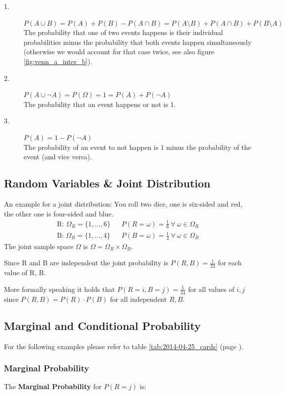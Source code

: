 \begin{description}
  \item[1.] $P(A \cup B) = P(A) + P(B) - P(A \cap B) = P(A \setminus B) + P(A \cap B) + P(B \setminus A)$
            \\ The probability that one of two events happens is their individual probabilities minus the probability that both events happen simultaneously (otherwise we would account for that case twice, see also figure \nolinebreak\ref{fig:venn_a_inter_b}).
  \item[2.] $P(A \cup \neg A) = P(\Omega) = 1 = P(A) + P(\neg A)$
            \\ The probability that an event happens or not is 1.
  \item[3.] $P(A) = 1 - P(\neg A)$
            \\ The probability of an event to not happen is 1 minus the probability of the event (and vice versa).
\end{description}

\subsection{Random Variables \& Joint Distribution}
An example for a joint distribution: You roll two dice, one is six-sided and red, the other one is four-sided and blue.
\begin{align*}
\mbox{R: }\Omega_R = \{1, ..., 6\} & & P(R=\omega) = \frac{1}{6}\ \forall\ \omega \in \Omega_R\\
\mbox{B: }\Omega_B = \{1, ..., 4\} & & P(B=\omega) = \frac{1}{4}\ \forall\ \omega \in \Omega_B
\end{align*}
The joint sample space $\Omega$ is $\Omega = \Omega_R \times \Omega_B$.

Since R and B are independent the joint probability is $ P(R, B) = \frac{1}{24}$ for each value of R, B.

More formally speaking it holds that $P(R=i, B=j) = \frac{1}{24}$ for all values of $i, j$ since $P(R, B) = P(R) \cdot P(B)$ for all independent $R, B$.



\subsection{Marginal and Conditional Probability}
For the following examples please refer to table \ref{tab:2014-04-25_cards} (page \pageref{tab:2014-04-25_cards}).

\subsubsection*{Marginal Probability}
The \textbf{Marginal Probability} for $P(R=j)$ is:

